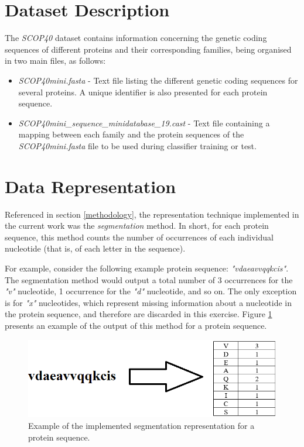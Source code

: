\documentclass[11pt]{article}
\begin{document}
\section{Dataset Description}
\label{dataset_description}

The \emph{SCOP40} dataset contains information concerning the genetic coding sequences of different proteins and their corresponding families, being organised in two main files, as follows:

\begin{itemize}
	\item \emph{SCOP40mini.fasta} - Text file listing the different genetic coding sequences for several proteins. A unique identifier is also presented for each protein sequence.
	
	\item \emph{SCOP40mini\_sequence\_minidatabase\_19.cast} - Text file containing a mapping between each family and the protein sequences of the \emph{SCOP40mini.fasta} file to be used during classifier training or test.
\end{itemize}

\section{Data Representation}
\label{data_representation}

Referenced in section \ref{methodology}, the representation technique implemented in the current work was the \emph{segmentation} method. In short, for each protein sequence, this method counts the number of occurrences of each individual nucleotide (that is, of each letter in the sequence).

For example, consider the following example protein sequence: \emph{"vdaeavvqqkcis"}. The segmentation method would output a total number of 3 occurrences for the \emph{"v"} nucleotide, 1 occurrence for the \emph{"d"} nucleotide, and so on. The only exception is for \emph{"x"} nucleotides, which represent missing information about a nucleotide in the protein sequence, and therefore are discarded in this exercise. Figure \ref{representation_example} presents an example of the output of this method for a protein sequence. 

\begin{figure}[h]
	\centering
	\includegraphics[scale=0.7]{images/representation.png}
	\caption{Example of the implemented segmentation representation for a protein sequence.}
	\label{representation_example}
\end{figure}
\end{document}
